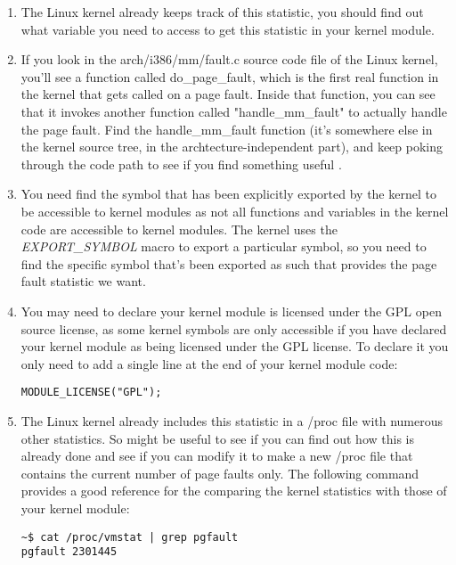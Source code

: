 \documentclass[11pt]{article}
\begin{document}
\begin{enumerate}
\item The Linux kernel already keeps track of this statistic, you should find out what variable you need to access to get this statistic in your kernel module.
\item If you look in the arch/i386/mm/fault.c source code file of the Linux kernel, you'll see a function called do\_page\_fault, which is the first real function in the kernel that gets called on a page fault. Inside that function, you can see that it invokes another function called "handle\_mm\_fault" to actually handle the page fault. Find the handle\_mm\_fault function (it's somewhere else in the kernel source tree, in the archtecture-independent part), and keep poking through the code path to see if you find something useful \cite{cse551}.
\item You need find the symbol that has been explicitly exported by the kernel to be accessible to kernel modules as not all functions and variables in the kernel code are accessible to kernel modules. The kernel uses the \emph{EXPORT\_SYMBOL} macro to export a particular symbol, so you need to find the specific symbol that's been exported as such that provides the page fault statistic we want.
\item You may need to declare your kernel module is licensed under the GPL open source license, as some kernel symbols are only accessible if you have declared your kernel module as being licensed under the GPL license. To declare it you only need to add a single line at the end of your kernel module code\cite{gpl}:

\begin{verbatim}
MODULE_LICENSE("GPL");
\end{verbatim}

\item The Linux kernel already includes this statistic in a /proc file with numerous other statistics. So might be useful to see if you can find out how this is already done and see if you can modify it to make a new /proc file that contains the current number of page faults only. The following command provides a good reference for the comparing the kernel statistics with those of your kernel module:

\begin{verbatim}
~$ cat /proc/vmstat | grep pgfault
pgfault 2301445
\end{verbatim}
\end{enumerate}
\end{document}
